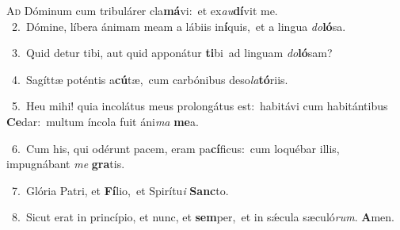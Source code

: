 \lettrine{\initial\textcolor{\initialcolor}{A}}{d} Dóminum cum tribulárer cla\-\textbf{má}\-vi:~\star et ex\-\textit{au}\-\textbf{dí}vit me.\\
{\numbfont\textcolor{\numbcolor}{~2.}}~Dómine, líbera ánimam meam a lábiis in\-\textbf{í}\-quis,~\star et a lingua \textit{do}\-\textbf{ló}sa.\par
{\numbfont\textcolor{\numbcolor}{~3.}}~Quid detur tibi, aut quid apponátur \textbf{ti}\-bi~\star ad linguam \textit{do}\-\textbf{ló}sam?\par
{\numbfont\textcolor{\numbcolor}{~4.}}~Sagíttæ poténtis a\-\textbf{cú}\-tæ,~\star cum carbónibus deso\-\textit{la}\-\textbf{tó}riis.\par
{\numbfont\textcolor{\numbcolor}{~5.}}~Heu mihi! quia incolátus meus prolongátus est:~\dagger habitávi cum habitántibus \textbf{Ce}\-dar:~\star multum íncola fuit áni\textit{ma} \textbf{me}\-a.\par
{\numbfont\textcolor{\numbcolor}{~6.}}~Cum his, qui odérunt pacem, eram pa\-\textbf{cí}\-ficus:~\star cum loquébar illis, impugnábant \textit{me} \textbf{gra}\-tis.\par
{\numbfont\textcolor{\numbcolor}{~7.}}~Glória Patri, et \textbf{Fí}\-lio,~\star et Spirítu\textit{i} \textbf{Sanc}\-to.\par
{\numbfont\textcolor{\numbcolor}{~8.}}~Sicut erat in princípio, et nunc, et \textbf{sem}\-per,~\star et in sǽcula sæculó\-\textit{rum}\-. \textbf{A}\-men.\par
